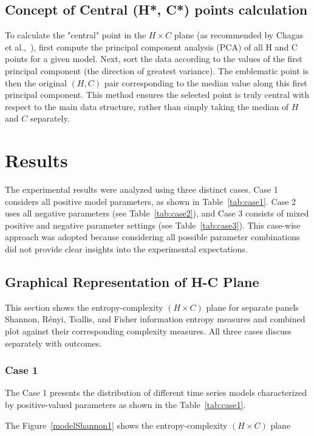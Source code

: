 \documentclass[12pt,a4paper]{article}
\begin{document}
	
	\subsection{Concept of Central (H*, C*) points calculation}
	
	To calculate the "central" point in the $H \times C$ plane (as recommended by Chagas et al.,~\cite{Chagas2022a}), first compute the principal component analysis (PCA) of all H and C points for a given model. Next, sort the data according to the values of the first principal component (the direction of greatest variance). The emblematic point is then the original $(H,C)$ pair corresponding to the median value along this first principal component. This method ensures the selected point is truly central with respect to the main data structure, rather than simply taking the median of $H$ and $C$ separately.
	
	\section{Results}
	The experimental results were analyzed using three distinct cases. Case 1 considers all positive model parameters, as shown in Table~\ref{tab:case1}. Case 2 uses all negative parameters (see Table~\ref{tab:case2}), and Case 3 consists of mixed positive and negative parameter settings (see Table~\ref{tab:case3}). This case-wise approach was adopted because considering all possible parameter combinations did not provide clear insights into the experimental expectations.
	
	\subsection{Graphical Representation of H-C Plane}
	This section shows the entropy-complexity $(H\times C) $ plane for separate panels Shannon, Rényi, Tsallis, and Fisher information entropy measures and combined plot against their corresponding complexity measures. All three cases discuss separately with outcomes. 
	
	\subsubsection{Case 1}
	The Case 1 presents the distribution of different time series models characterized by positive-valued parameters as shown in the Table~\ref{tab:case1}.
	
	The Figure~\ref{modelShannon1} shows the entropy-complexity $(H\times C) $ plane
	
\end{document}
